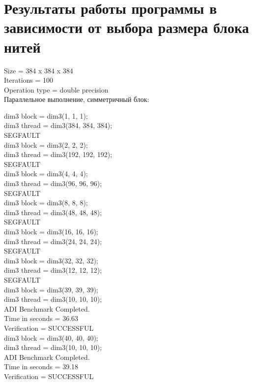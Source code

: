 \documentclass[a4paper,12pt,titlepage,draft]{article}
\begin{document}
\section{Результаты работы программы в зависимости от выбора размера блока нитей}
\begin{center}
    Size            =  384 x  384 x  384\\
    Iterations      =                100\\
    Operation type  =   double precision\\
    Параллельное выполнение, симметричный блок:\\
\end{center}
\begin{minipage}{.5\textwidth}
    dim3 block = dim3(1, 1, 1);\\
    dim3 thread = dim3(384, 384, 384);\\
    SEGFAULT\\
    
    dim3 block = dim3(2, 2, 2);\\
    dim3 thread = dim3(192, 192, 192);\\
    SEGFAULT\\
    
    dim3 block = dim3(4, 4, 4);\\
    dim3 thread = dim3(96, 96, 96);\\
    SEGFAULT\\
    
    dim3 block = dim3(8, 8, 8);\\
    dim3 thread = dim3(48, 48, 48);\\
    SEGFAULT\\
    
    dim3 block = dim3(16, 16, 16);\\
    dim3 thread = dim3(24, 24, 24);\\
    SEGFAULT\\
    
    dim3 block = dim3(32, 32, 32);\\
    dim3 thread = dim3(12, 12, 12);\\
    SEGFAULT\\
    
    dim3 block = dim3(39, 39, 39);\\
    dim3 thread = dim3(10, 10, 10);\\
    ADI Benchmark Completed.\\
    Time in seconds =             36.63\\
    Verification    =         SUCCESSFUL\\
    
    dim3 block = dim3(40, 40, 40);\\
    dim3 thread = dim3(10, 10, 10);\\
    ADI Benchmark Completed.\\
    Time in seconds =             39.18\\
    Verification    =         SUCCESSFUL\\
\end{minipage}
\end{document}
